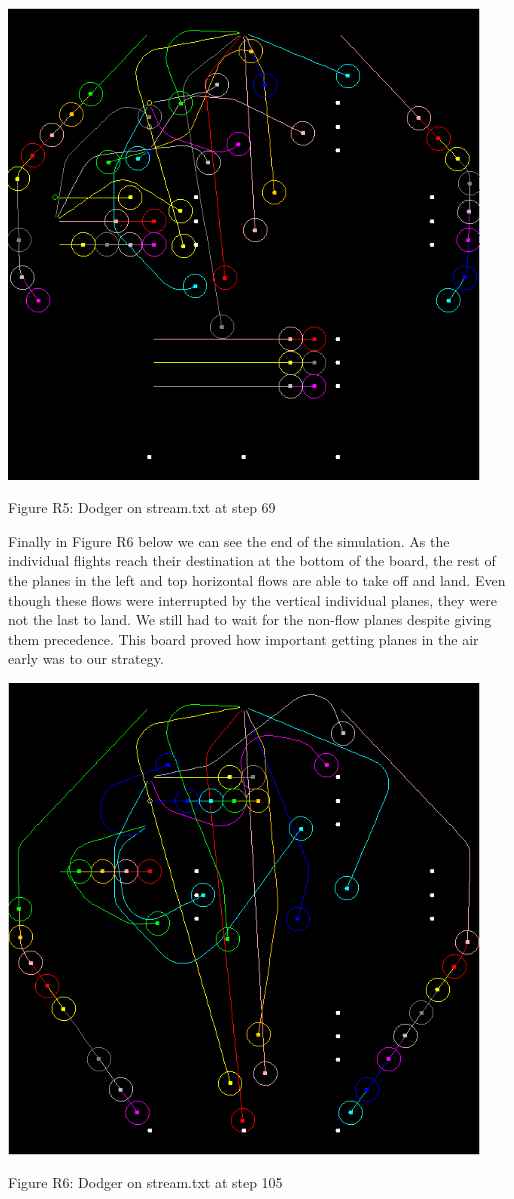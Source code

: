\documentclass[10pt]{article}
\begin{document}
\includegraphics[width=125mm]{pics/R5.png}
\caption{Figure R5: Dodger on stream.txt at step 69}

Finally in Figure R6 below we can see the end of the simulation. As the individual flights reach their destination at the bottom of the board, the rest of the planes in the left and top horizontal flows are able to take off and land. Even though these flows were interrupted by the vertical individual planes, they were not the last to land. We still had to wait for the non-flow planes despite giving them precedence. This board proved how important getting planes in the air early was to our strategy.

\includegraphics[width=125mm]{pics/R6.png}
\caption{Figure R6: Dodger on stream.txt at step 105}
\end{document}
